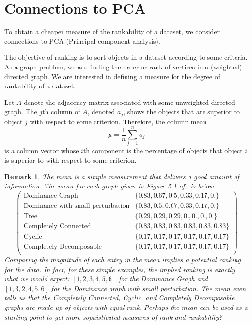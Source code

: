 \documentclass{article}
\newtheorem{remark}[theorem]{Remark}
\begin{document}
\section{Connections to PCA}\label{sec: pca}
To obtain a cheaper measure of the rankability of a dataset, we consider connections to PCA (Principal component analysis). 

The objective of ranking is to sort objects in a dataset according to some criteria. 
As a graph problem, we are finding the order or rank of vertices in a (weighted) directed graph. 
We are interested in defining a measure for the degree of rankability of a dataset. 

Let $A$ denote the adjacency matrix associated with some unweighted directed graph. 
The $j$th column of $A$, denoted $a_{j}$, shows the objects that are superior to object $j$ with respect to some criterion. 
Therefore, the column mean
\begin{equation}\label{eq: mu}
\mu = \frac{1}{n}\sum_{j=1}^{n}a_{j}
\end{equation}
is a column vector whose $i$th component is the percentage of objects that object $i$ is superior to with respect to some criterion. 

\begin{remark}
The mean is a simple measurement that delivers a good amount of information. 
The mean for each graph given in Figure 5.1 of~\cite{Anderson} is below.
\[
\left(
\begin{array}{cc}
 \text{Dominance Graph} & \{0.83,0.67,0.5,0.33,0.17,0.\} \\
 \text{Dominance with small perturbation} & \{0.83,0.5,0.67,0.33,0.17,0.\} \\
 \text{Tree} & \{0.29,0.29,0.29,0.,0.,0.,0.\} \\
 \text{Completely Connected} & \{0.83,0.83,0.83,0.83,0.83,0.83\} \\
 \text{Cyclic} & \{0.17,0.17,0.17,0.17,0.17,0.17\} \\
 \text{Completely Decomposable} & \{0.17,0.17,0.17,0.17,0.17,0.17\} \\
\end{array}
\right)
\]
Comparing the magnitude of each entry in the mean implies a potential ranking for the data.
In fact, for these simple examples, the implied ranking is exactly what we would expect:
$[1,2,3,4,5,6]$ for the Dominance Graph and $[1,3,2,4,5,6]$ for the Dominance graph with small perturbation.
The mean even tells us that the Completely Connected, Cyclic, and Completely Decomposable graphs are made up of objects with equal rank. 
Perhaps the mean can be used as a starting point to get more sophisticated measures of rank and rankability?
\end{remark}
\end{document}
